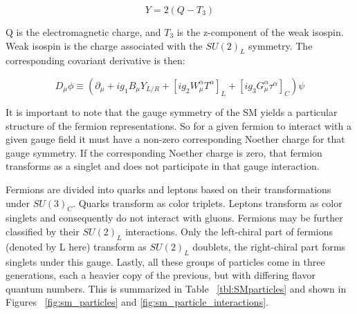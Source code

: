 \begin{equation}
Y= 2(Q-T_{3})
\end{equation}

Q is the electromagnetic charge, and $ T_{3}$ is the z-component of the weak isospin. Weak isospin is the charge associated with the $SU(2)_{L}$ symmetry. The corresponding covariant derivative is then:

\begin{equation}
D_{\mu}\phi \equiv (\partial_{\mu} + ig_{1}B_{\mu}Y_{L/R} + [ig_{2}W^{\alpha}_{\mu}T^{\alpha}]_{L} + [ig_{3}G^{\alpha}_{\mu}\tau^{\alpha}]_{C})\psi
\end{equation}

It is important to note that the gauge symmetry of the SM yields a particular structure of the fermion representations. So for a given fermion to interact with a given gauge field it must have a non-zero corresponding Noether charge for that gauge symmetry. If the corresponding Noether charge is zero, that fermion transforms as a singlet and does not participate in that gauge interaction. 

Fermions are divided into quarks and leptons based on their transformations under $SU(3)_{C}$. Quarks transform as color triplets. Leptons transform as color singlets and consequently do not interact with gluons. 
Fermions may be further classified by their $SU(2)_{L}$ interactions. Only the left-chiral part of fermions (denoted by L here) transform as $SU(2)_{L}$ doublets, the right-chiral part forms singlets under this gauge. Lastly, all these groups of particles come in three generations, each a heavier copy of the previous, but with differing flavor quantum numbers. This is summarized in Table ~\ref{tbl:SMparticles} and shown in Figures ~\ref{fig:sm_particles} and \ref{fig:sm_particle_interactions}.

